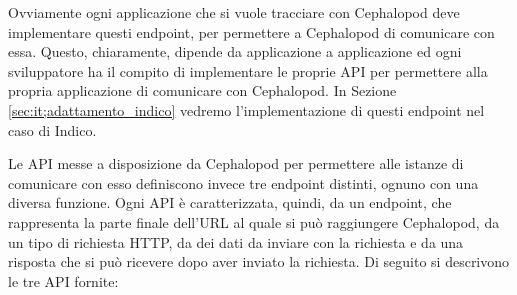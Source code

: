             Ovviamente ogni applicazione che si vuole tracciare con Cephalopod deve implementare questi endpoint, per permettere a Cephalopod di comunicare con essa. Questo, chiaramente, dipende da applicazione a applicazione ed ogni sviluppatore ha il compito di implementare le proprie \ac{API} per permettere alla propria applicazione di comunicare con Cephalopod. In Sezione \ref{sec:it;adattamento_indico} vedremo l'implementazione di questi endpoint nel caso di Indico.
            
            Le \ac{API} messe a disposizione da Cephalopod per permettere alle istanze di comunicare con esso definiscono invece tre endpoint distinti, ognuno con una diversa funzione. Ogni \ac{API} è caratterizzata, quindi, da un endpoint, che rappresenta la parte finale dell'\ac{URL} al quale si può raggiungere Cephalopod, da un tipo di richiesta \ac{HTTP}, da dei dati da inviare con la richiesta e da una risposta che si può ricevere dopo aver inviato la richiesta. Di seguito si descrivono le tre \ac{API} fornite: 
            
